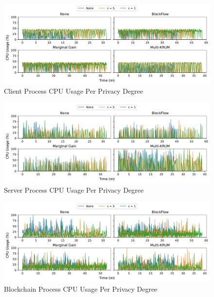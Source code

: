 \clearpage

\begin{figure}[!h]
    \centering
    \includegraphics[width=\textwidth]{graphics/privacy/cpu_client.pdf}
    \caption{Client Process CPU Usage Per Privacy Degree}
    \label{fig:cpu_privacy_clients}
\end{figure}

\vfill

\begin{figure}[!h]
    \centering
    \includegraphics[width=\textwidth]{graphics/privacy/cpu_server.pdf}
    \caption{Server Process CPU Usage Per Privacy Degree}
    \label{fig:cpu_privacy_servers}
\end{figure}

\vfill

\begin{figure}[!h]
    \centering
    \includegraphics[width=\textwidth]{graphics/privacy/cpu_miner.pdf}
    \caption{Blockchain Process CPU Usage Per Privacy Degree}
    \label{fig:cpu_privacy_miners}
\end{figure}


